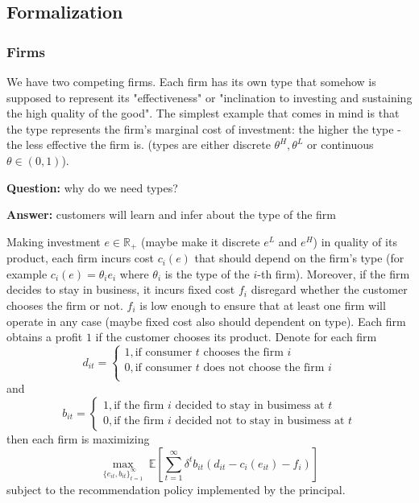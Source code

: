 \documentclass[a4paper]{article}
\newcommand{\expect}{\mathbb{E}}
\begin{document}
	\subsection{Formalization}
	\subsubsection{Firms}
	We have two competing firms. Each firm has its own type that somehow is supposed to represent its "effectiveness" or "inclination to investing and sustaining the high quality of the good". The simplest example that comes in mind is that the type represents the firm's marginal cost of investment: the higher the type - the less effective the firm is. (types are either discrete $\theta^H, \theta^L$ or continuous $\theta \in (0, 1)$). 
	
	
	
	\textbf{Question:} why do we need types?
		
	
	
	
	\textbf{Answer:} customers will learn and infer about the type of the firm
	
	
	
	
	Making investment $e \in \mathbb{R}_{+}$ (maybe make it discrete $e^L$ and $e^H$) in quality of its product, each firm incurs cost $c_i(e)$ that should depend on the firm's type (for example $c_i(e) = \theta_ie_i$ where $\theta_i$ is the type of the $i$-th firm). Moreover, if the firm decides to stay in business, it incurs fixed cost $f_i$ disregard whether the customer chooses the firm or not. $f_i$ is low enough to ensure that at least one firm will operate in any case (maybe fixed cost also should dependent on type).
	Each firm obtains a profit $1$ if the customer chooses its product. Denote for each firm $$d_{it} = \begin{cases}
	1, \text{if consumer }t\text{ chooses the firm }i\\
	0, \text{if consumer }t\text{ does not choose the firm }i\\
	\end{cases}$$
	and
	$$b_{it} = \begin{cases}
	1, \text{if the firm }i\text{ decided to stay in busimess at }t\\
	0, \text{if the firm }i\text{ decided not to stay in busimess at }t
	\end{cases}$$
	then each firm is maximizing $$\underset{\{e_{it}, b_{it}\}_{t=1}^{\infty} }{\max}\ \expect \left[\sum_{t=1}^{\infty} \delta^t b_{it}(d_{it} - c_i(e_{it})- f_i)\right]$$
	subject to the recommendation policy implemented by the principal.
	
\end{document}
